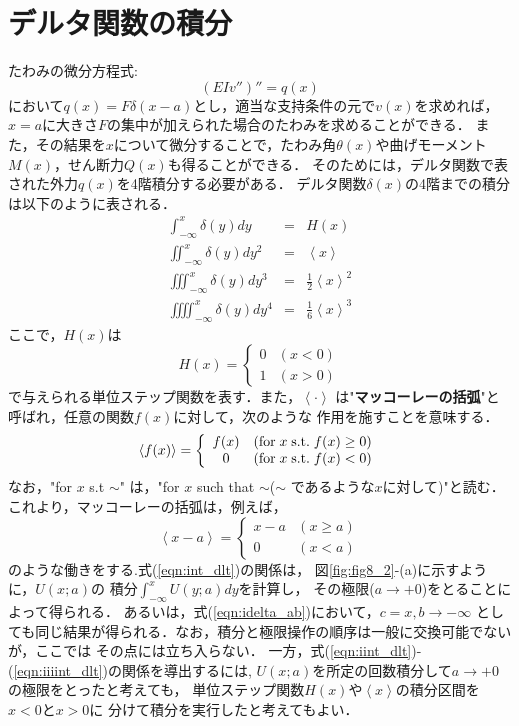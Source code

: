 \documentclass[10pt,a4j]{jarticle}
\begin{document}
\section{デルタ関数の積分}
たわみの微分方程式:
\begin{equation}
	\left(EIv''\right)''=q(x)
\end{equation}
において$q(x)=F\delta(x-a)$とし，適当な支持条件の元で$v(x)$を求めれば，
$x=a$に大きさ$F$の集中が加えられた場合のたわみを求めることができる．
また，その結果を$x$について微分することで，たわみ角$\theta(x)$や曲げモーメント
$M(x)$，せん断力$Q(x)$も得ることができる．
そのためには，デルタ関数で表された外力$q(x)$を4階積分する必要がある．
デルタ関数$\delta(x)$の4階までの積分は以下のように表される．
\begin{eqnarray}
	\int_{-\infty}^x \delta(y)dy &=& H(x) 
	\label{eqn:int_dlt}
	\\ 
	\iint_{-\infty}^x \delta(y)dy^2 &=& \left< x\right> 
	\label{eqn:iint_dlt}
	\\ 
	\iiint_{-\infty}^x \delta(y)dy^3 &=& \frac{1}{2}\left<x\right>^2
	\label{eqn:iiint_dlt}
	\\ 
	\iiiint_{-\infty}^x \delta(y)dy^4 &=& \frac{1}{6}\left<x\right>^3
	\label{eqn:iiiint_dlt}
\end{eqnarray}
ここで，$H(x)$は
\begin{equation}
	H(x)=\left\{
	\begin{array}{cc}
		0 & (x<0) \\
		1 & (x>0)
	\end{array}
	\right.
\end{equation}
で与えられる単位ステップ関数を表す．また，$\left< \cdot \right>$
は"{\bf マッコーレーの括弧}"と呼ばれ，任意の関数$f(x)$に対して，次のような
作用を施すことを意味する．
\begin{equation}
	\left< f(x) \right>=
	\left\{
	\begin{array}{cc}
		f(x) & ({\rm for\;} x\; {\rm s.t.} \; f(x) \ge 0) \\
		0 & ({\rm for}\; x \; {\rm s.t.} \;  f(x) < 0)
	\end{array}
	\right.
\end{equation}
なお，"for $x$ s.t $\sim$" は，"for $x$ such that $\sim $($\sim$ であるような$x$に対して)"と読む．
これより，マッコーレーの括弧は，例えば，
\begin{equation}
	\left< x-a \right>=
	\left\{
	\begin{array}{cc}
		x-a & (x \ge a) \\
		0 & (x <a)
	\end{array}
	\right.
\end{equation}
のような働きをする.式(\ref{eqn:int_dlt})の関係は，
図\ref{fig:fig8_2}-(a)に示すように，$U(x;a)$の
積分$\int_{-\infty}^x U(y;a)dy$を計算し，
その極限($a\rightarrow +0$)をとることによって得られる．
あるいは，式(\ref{eqn:idelta_ab})において，$c=x,b\rightarrow -\infty$
としても同じ結果が得られる．なお，積分と極限操作の順序は一般に交換可能でないが，ここでは
その点には立ち入らない．
一方，式(\ref{eqn:iint_dlt})-(\ref{eqn:iiiint_dlt})の関係を導出するには,
$U(x;a)$を所定の回数積分して$a\rightarrow +0$の極限をとったと考えても，
単位ステップ関数$H(x)$や$\left< x \right>$の積分区間を$x<0$と$x>0$に
分けて積分を実行したと考えてもよい．
\end{document}
